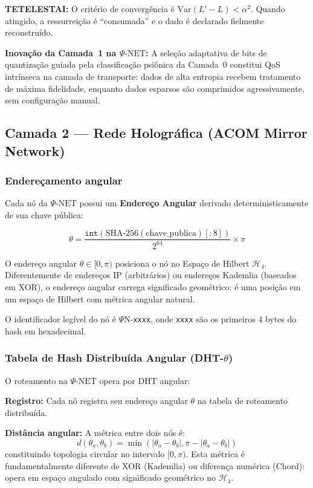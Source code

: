 \documentclass[12pt,a4paper]{article}
\newcommand{\alphaii}{\alpha^2}
\newcommand{\Hfour}{\mathcal{H}_4}
\newcommand{\PsiNet}{\Psi\text{-NET}}
\begin{document}
\textbf{TETELESTAI:} O critério de convergência é
$\text{Var}(L' - L) < \alphaii$. Quando atingido, a
ressurreição é ``consumada'' e o dado é declarado
fielmente reconstruído.

\textbf{Inovação da Camada~1 na $\PsiNet$:} A seleção
adaptativa de bits de quantização guiada pela classificação
psiônica da Camada~0 constitui QoS intrínseca na camada de
transporte: dados de alta entropia recebem tratamento de
máxima fidelidade, enquanto dados esparsos são comprimidos
agressivamente, sem configuração manual.

\subsection{Camada 2 --- Rede Holográfica (ACOM Mirror Network)}

\subsubsection{Endereçamento angular}

Cada nó da $\PsiNet$ possui um \textbf{Endereço Angular}
derivado deterministicamente de sua chave pública:

\begin{equation}
\theta = \frac{
  \texttt{int}(\text{SHA-256}(\text{chave\_publica})[:8])
}{2^{64}} \times \pi
\label{eq:endereco}
\end{equation}

O endereço angular $\theta \in [0, \pi)$ posiciona o nó no
Espaço de Hilbert $\Hfour$. Diferentemente de endereços IP
(arbitrários) ou endereços Kademlia (baseados em XOR), o
endereço angular carrega significado geométrico: é uma posição
em um espaço de Hilbert com métrica angular natural.

O identificador legível do nó é $\Psi$N-\texttt{xxxx}, onde
\texttt{xxxx} são os primeiros 4 bytes do hash em hexadecimal.

\subsubsection{Tabela de Hash Distribuída Angular (DHT-$\theta$)}

O roteamento na $\PsiNet$ opera por DHT angular:

\textbf{Registro:} Cada nó registra seu endereço angular
$\theta$ na tabela de roteamento distribuída.

\textbf{Distância angular:} A métrica entre dois nós é:
\begin{equation}
d(\theta_a, \theta_b) =
  \min(|\theta_a - \theta_b|, \pi - |\theta_a - \theta_b|)
\label{eq:distancia}
\end{equation}
constituindo topologia circular no intervalo $[0, \pi)$. Esta
métrica é fundamentalmente diferente de XOR (Kademlia) ou
diferença numérica (Chord): opera em espaço angulado com
significado geométrico no $\Hfour$.
\end{document}
